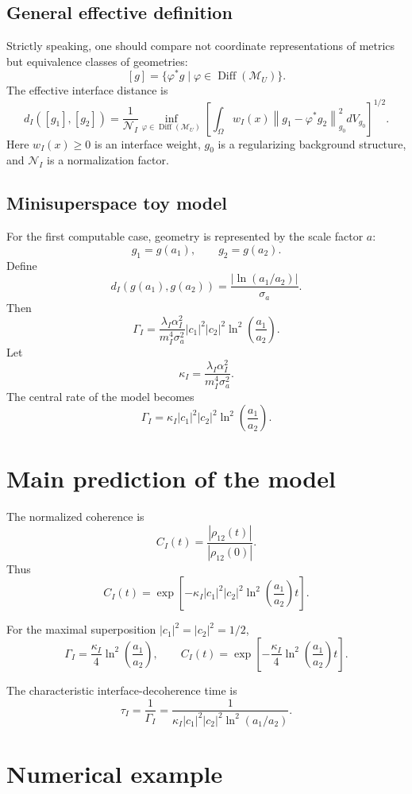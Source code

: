 \documentclass[12pt,a4paper]{article}
\DeclareMathOperator{\Diff}{Diff}
\newcommand{\M}{\mathcal M_U}
\begin{document}
\subsection{General effective definition}

Strictly speaking, one should compare not coordinate representations of metrics but equivalence classes of geometries:
\[
[g]=\{\varphi^*g\mid \varphi\in\Diff(\M)\}.
\]
The effective interface distance is
\[
\boxed{
d_I([g_1],[g_2])
=
\frac{1}{\mathcal N_I}
\inf_{\varphi\in\Diff(\M)}
\left[
\int_\Omega
w_I(x)
\left\|g_1-\varphi^*g_2\right\|_{g_0}^2
 dV_{g_0}
\right]^{1/2}.
}
\]
Here \(w_I(x)\geq0\) is an interface weight, \(g_0\) is a regularizing background structure, and \(\mathcal N_I\) is a normalization factor.

\subsection{Minisuperspace toy model}

For the first computable case, geometry is represented by the scale factor \(a\):
\[
g_1=g(a_1),
\qquad
 g_2=g(a_2).
\]
Define
\[
\boxed{
d_I(g(a_1),g(a_2))=\frac{|\ln(a_1/a_2)|}{\sigma_a}.
}
\]
Then
\[
\Gamma_I
=
\frac{\lambda_I\alpha_I^2}{m_I^4\sigma_a^2}
|c_1|^2|c_2|^2
\ln^2\left(\frac{a_1}{a_2}\right).
\]
Let
\[
\kappa_I=\frac{\lambda_I\alpha_I^2}{m_I^4\sigma_a^2}.
\]
The central rate of the model becomes
\[
\boxed{
\Gamma_I
=
\kappa_I |c_1|^2|c_2|^2
\ln^2\left(\frac{a_1}{a_2}\right).
}
\]

\section{Main prediction of the model}

The normalized coherence is
\[
C_I(t)=\frac{|\rho_{12}(t)|}{|\rho_{12}(0)|}.
\]
Thus
\[
\boxed{
C_I(t)=
\exp\left[-
\kappa_I |c_1|^2|c_2|^2
\ln^2\left(\frac{a_1}{a_2}\right)t
\right].
}
\]

For the maximal superposition \(|c_1|^2=|c_2|^2=1/2\),
\[
\boxed{
\Gamma_I=\frac{\kappa_I}{4}\ln^2\left(\frac{a_1}{a_2}\right),
\qquad
C_I(t)=\exp\left[-\frac{\kappa_I}{4}\ln^2\left(\frac{a_1}{a_2}\right)t\right].
}
\]

The characteristic interface-decoherence time is
\[
\boxed{
\tau_I=\frac{1}{\Gamma_I}
=
\frac{1}{\kappa_I |c_1|^2|c_2|^2\ln^2(a_1/a_2)}.
}
\]

\section{Numerical example}
\end{document}
